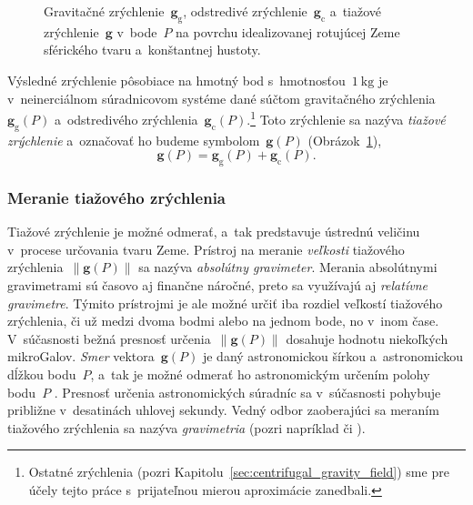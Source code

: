 \documentclass[a4paper, 12pt]{book}
\newcommand{\gidx}{\mathrm g}
\newcommand{\cidx}{\mathrm c}
\let\vec\mathbf
\begin{document}
\begin{figure}
\centering

\caption{Gravitačné zrýchlenie~$\vec g_\gidx$, odstredivé zrýchlenie~$\vec 
g_\cidx$ a~tiažové zrýchlenie~$\vec g$ v~bode~$P$ na povrchu idealizovanej 
rotujúcej Zeme sférického tvaru a~konštantnej hustoty.}
\label{fig:gravity_vector}
\end{figure}

Výsledné zrýchlenie pôsobiace na hmotný bod s~hmotnosťou~$1 \ \mathrm{kg}$ je 
v~neinerciálnom súradnicovom systéme dané súčtom gravitačného zrýchlenia~$\vec 
g_\gidx(P)$ a~odstredivého zrýchlenia~$\vec g_\cidx(P)$.\footnote{Ostatné 
zrýchlenia (pozri Kapitolu~\ref{sec:centrifugal_gravity_field}) sme pre účely 
tejto práce s~prijateľnou mierou aproximácie zanedbali.}  Toto zrýchlenie sa 
nazýva \emph{tiažové zrýchlenie} a~označovať ho budeme symbolom~$\vec g(P)$ 
(Obrázok~\ref{fig:gravity_vector}),
%
\begin{equation}
\label{eq:g}
\vec g(P) = \vec g_\gidx(P) + \vec g_\cidx(P){.}
\end{equation}


\subsubsection{Meranie tiažového zrýchlenia}
\label{sec:gravity_measurements}

Tiažové zrýchlenie je možné odmerať, a~tak predstavuje ústrednú veličinu 
v~procese určovania tvaru Zeme.  Prístroj na meranie \emph{veľkosti} tiažového 
zrýchlenia~$\| \vec g(P) \|$ sa nazýva \emph{absolútny gravimeter}.  Merania 
absolútnymi gravimetrami sú časovo aj finančne náročné, preto sa využívajú aj 
\emph{relatívne gravimetre}.  Týmito prístrojmi je ale možné určiť iba rozdiel 
veľkostí tiažového zrýchlenia, či už medzi dvoma bodmi alebo na jednom bode, no 
v~inom čase.  V~súčasnosti bežná presnosť určenia~$\| \vec g(P) \|$ dosahuje 
hodnotu niekoľkých mikroGalov.  \emph{Smer} vektora~$\vec g(P)$ je daný 
astronomickou šírkou a~astronomickou dĺžkou bodu~$P$, a~tak je možné odmerať ho 
astronomickým určením polohy bodu~$P$ \parencite{MoritzPhysicalGeodesy}.  
Presnosť určenia astronomických súradníc sa v~súčasnosti pohybuje približne 
v~desatinách uhlovej sekundy.    Vedný odbor zaoberajúci sa meraním tiažového 
zrýchlenia sa nazýva \emph{gravimetria} (pozri napríklad 
\cite{Torge1989,Rozimant1994} či \cite{Janak2010}).  
\end{document}
